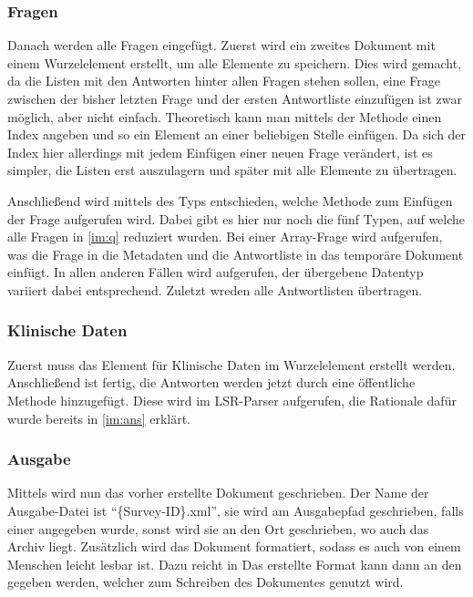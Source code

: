 \subsubsection{Fragen}

Danach werden alle Fragen eingefügt.
Zuerst wird ein zweites Dokument mit einem Wurzelelement erstellt, um alle  Elemente zu speichern.
Dies wird gemacht, da die Listen mit den Antworten hinter allen Fragen stehen sollen, eine Frage zwischen der bisher letzten Frage und der ersten Antwortliste einzufügen ist zwar möglich, aber nicht einfach.
Theoretisch kann man mittels der Methode  einen Index angeben und so ein Element an einer beliebigen Stelle einfügen.
Da sich der Index hier allerdings mit jedem Einfügen einer neuen Frage verändert, ist es simpler, die Listen erst auszulagern und später mit  alle Elemente zu übertragen.

Anschließend wird mittels des Typs entschieden, welche Methode zum Einfügen der Frage aufgerufen wird.
Dabei gibt es hier nur noch die fünf Typen, auf welche alle Fragen in \cref{im:q} reduziert wurden.
Bei einer Array-Frage wird  aufgerufen, was die Frage in die Metadaten und die Antwortliste in das temporäre Dokument einfügt.
In allen anderen Fällen wird  aufgerufen, der übergebene Datentyp variiert dabei entsprechend.
Zuletzt wreden alle Antwortlisten übertragen.

\subsubsection{Klinische Daten}

Zuerst muss das Element für Klinische Daten im Wurzelelement erstellt werden.
Anschließend ist  fertig, die Antworten werden jetzt durch eine öffentliche Methode hinzugefügt. %
Diese wird im LSR-Parser aufgerufen, die Rationale dafür wurde bereits in \cref{im:ans} erklärt.

\subsubsection{Ausgabe}

Mittels  wird nun das vorher erstellte Dokument geschrieben.
Der Name der Ausgabe-Datei ist \enquote{\{Survey-ID\}.xml}, sie wird am Ausgabepfad geschrieben, falls einer angegeben wurde, sonst wird sie an den Ort geschrieben, wo auch das Archiv liegt.
Zusätzlich wird das Dokument formatiert, sodass es auch von einem Menschen leicht lesbar ist. Dazu reicht in 
Das erstellte Format kann dann an den  gegeben werden, welcher zum Schreiben des Dokumentes genutzt wird.

